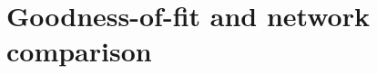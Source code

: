 \documentclass[8pt]{beamer}
\begin{document}
\section{Goodness-of-fit and network comparison}
% 
% 
%   
% 
%   
% 
\end{document}
